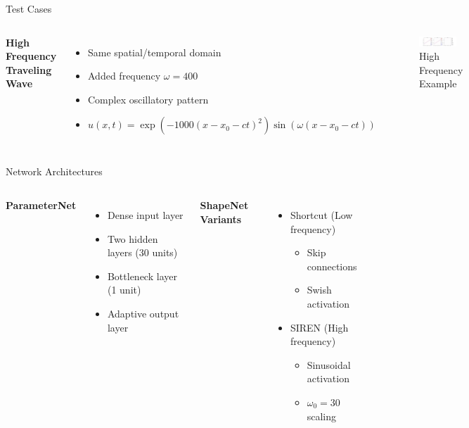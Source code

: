 \documentclass{beamer}
\begin{document}
\begin{frame}{Test Cases}
    \begin{columns}
        \textbf{High Frequency Traveling Wave}
        \begin{itemize}
            \item Same spatial/temporal domain
            \item Added frequency $\omega = 400$
            \item Complex oscillatory pattern
            \item $u(x,t) = \exp(-1000(x-x_0-ct)^2)\sin(\omega(x-x_0-ct))$
        \end{itemize}
        
        \begin{figure}
            \includegraphics[width=0.85\textwidth,viewport=0 0 400 300,clip]{functional/high-frequency-adam-20250206-1520-1/vis}
            \caption{High Frequency Example}
        \end{figure}
    \end{columns}
\end{frame}

\begin{frame}{Network Architectures}
    \begin{columns}
        \textbf{ParameterNet}
        \begin{itemize}
            \item Dense input layer
            \item Two hidden layers (30 units)
            \item Bottleneck layer (1 unit)
            \item Adaptive output layer
        \end{itemize}
        
        \textbf{ShapeNet Variants}
        \begin{itemize}
            \item Shortcut (Low frequency)
            \begin{itemize}
                \item Skip connections
                \item Swish activation
            \end{itemize}
            \item SIREN (High frequency)
            \begin{itemize}
                \item Sinusoidal activation
                \item $\omega_0 = 30$ scaling
            \end{itemize}
        \end{itemize}
    \end{columns}
\end{frame}
\end{document}
